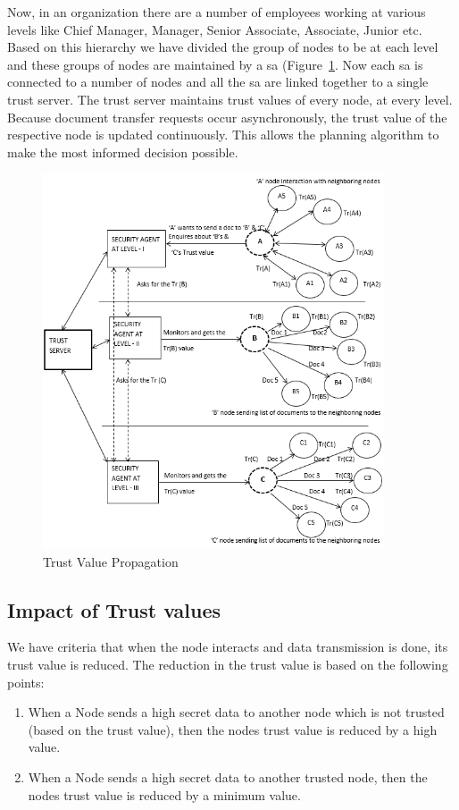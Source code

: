 Now, in an organization there are a number of employees working at various levels like
Chief Manager, Manager, Senior Associate, Associate, Junior etc. Based on this hierarchy we
have divided the group of nodes to be at each level and these groups of nodes are maintained
by a \gls{sa} (Figure~\ref{fig:TrustTransmission}. Now each \gls{sa} is connected to a number of nodes and all
the \Gls{sa} are linked together to a single trust server. The trust server
maintains trust values of every node, at every level. Because document transfer
requests occur asynchronously, the trust value of the respective node is updated
continuously. This allows the planning algorithm to
make the most informed decision possible. 



\begin{figure}[h!]
    \begin{center}
        \includegraphics[width=0.90\textwidth]{Figures/Trust_Propagation_Diagram.PNG}
        \caption{Trust Value Propagation}
        \label{fig:TrustTransmission}
    \end{center}
\end{figure}

\subsection{Impact of Trust values}
We have criteria that when the node interacts and data transmission is done, its trust value is
reduced. The reduction in the trust value is based on the following points:
\begin{enumerate}
    \item When a Node sends a high secret data to another node which is not trusted (based on
the trust value), then the nodes trust value is reduced by a high value.
    \item When a Node sends a high secret data to another trusted node, then the nodes trust
value is reduced by a minimum value.
\end{enumerate}

